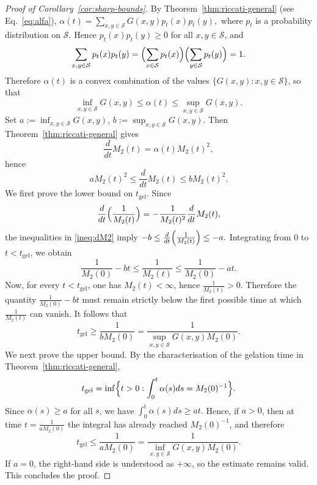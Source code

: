 \documentclass[12pt,twoside]{article}
\begin{document}
\begin{proof}[Proof of Corollary~\ref{cor:sharp-bounds}]
By Theorem~\ref{thm:riccati-general} (see Eq.~\eqref{eq:alfa}),
$
\alpha(t)=\sum_{x,y\in\mathcal S} G(x,y)p_t(x)p_t(y),
$
where $p_t$ is a probability distribution on $\mathcal S$. Hence
$p_t(x)p_t(y)\ge 0$ for all $x,y\in\mathcal S$, and
$$
\sum_{x,y\in\mathcal S} p_t(x)p_t(y)
=
\Bigl(\sum_{x\in\mathcal S} p_t(x)\Bigr)
\Bigl(\sum_{y\in\mathcal S} p_t(y)\Bigr)
=1.
$$
Therefore $\alpha(t)$ is a convex combination of the values
$\{G(x,y):x,y\in\mathcal S\}$, so that
$$
\inf_{x,y\in\mathcal S} G(x,y)
\le
\alpha(t)
\le
\sup_{x,y\in\mathcal S} G(x,y).
$$
Set
$
a:=\inf_{x,y\in\mathcal S} G(x,y)$,
$
b:=\sup_{x,y\in\mathcal S} G(x,y).
$
Then Theorem~\ref{thm:riccati-general} gives
$$
\frac{d}{dt}M_2(t)=\alpha(t)M_2(t)^2,
$$
hence
\begin{equation}\label{ineq:dM2}
aM_2(t)^2
\le
\frac{d}{dt}M_2(t)
\le
bM_2(t)^2.
\end{equation}
We first prove the lower bound on $t_{\mathrm{gel}}$. Since
$$
\frac{d}{dt}\Bigl(\frac{1}{M_2(t)}\Bigr)
=
-\frac{1}{M_2(t)^2}\frac{d}{dt}M_2(t),
$$
the inequalities in \eqref{ineq:dM2} imply
$
-b
\le
\frac{d}{dt}\Bigl(\frac{1}{M_2(t)}\Bigr)
\le
-a.
$
Integrating from $0$ to $t<t_{\mathrm{gel}}$, we obtain
$$
\frac{1}{M_2(0)}-bt
\le
\frac{1}{M_2(t)}
\le
\frac{1}{M_2(0)}-at.
$$
Now, for every $t<t_{\mathrm{gel}}$, one has $M_2(t)<\infty$, hence
$\frac1{M_2(t)}>0$. Therefore the quantity
$\frac{1}{M_2(0)}-bt$ must remain strictly below the first possible time at which
$\frac1{M_2(t)}$ can vanish. It follows that
$$
t_{\mathrm{gel}}
\ge
\frac{1}{bM_2(0)}
=
\frac{1}{\sup_{x,y\in\mathcal S} G(x,y)M_2(0)}.
$$
We next prove the upper bound. By the characterisation of the gelation time in
Theorem~\ref{thm:riccati-general},
$$
t_{\mathrm{gel}}
=
\inf
\Bigl\{
t>0:\int_0^t \alpha(s)ds=M_2(0)^{-1}
\Bigr\}.
$$
Since $\alpha(s)\ge a$ for all $s$, we have
$
\int_0^t \alpha(s)ds \geq at.
$
Hence, if $a>0$, then at time
$
t=\frac{1}{aM_2(0)}
$
the integral has already reached $M_2(0)^{-1}$, and therefore
$$
t_{\mathrm{gel}}
\le
\frac{1}{aM_2(0)}
=
\frac{1}{\inf_{x,y\in\mathcal S} G(x,y)M_2(0)}.
$$
If $a=0$, the right-hand side is understood as $+\infty$, so the estimate remains valid. This concludes the proof.
\end{proof}
\end{document}
